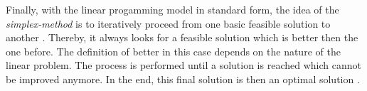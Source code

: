 Finally, with the linear progamming model in standard form, the idea of the \textit{simplex-method}
is to iteratively proceed from one basic feasible solution to another .
Thereby, it always looks for a feasible solution which is better then the one before. 
The definition of better in this case depends on the nature of the linear problem. 
The process is performed until a solution is reached which cannot 
be improved anymore. In the end, this final solution is then an optimal solution . 

\begin{comment}



# market design
Mathematical Optimization plays a central role in the design and analysis of multi-object 
markets and also provides a central foundation for theoretical models of mulit-object markets. 

However, market design is more than mathematical programming, as it takes into consideration bidding
strategies and human behavior. Ignoring bidding strategies and different types of manipulation 
in market-based resource allocation is like optimizing a problem with the wrong parameters. 

Overall, makret design aims at design principles and rules for market institutions which are robust
against manupulation and allow bidders to express their preferences, so that the designer can aim 
for good or even optimal allocations. This is similar to network security, where designers aim 
for secure network protocols that are hard to tamper with, 
knowing that there is no absolute security

# closed order book

\end{comment}



